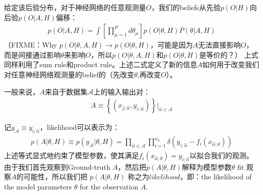 给定该后验分布，对于神经网络的任意观测量$O$，我们的beliefs从先验$p(O|H)$向后验$p(O|A,H)$偏移：
\begin{equation}
    \begin{split}
        p(O|A,H) = \int \left[\prod_{\mu=1}^{P}d\theta_\mu\right]
        p(O|\theta,H)P(\theta|A,H)
    \end{split}
\end{equation}
（FIXME：Why $p(O|\theta,A,H)\rightarrow p(O|\theta,H)$，可能是因为$A$无法直接影响$O$，而是间接通过影响$\theta$来影响$O$，所以$p(O|\theta,A,H)$和$p(O|\theta,H)$是等价的？）
上式同样利用了sum rule和product rule。上述二式定义了新的信息$A$如何用于改变我们对任意神经网络观测量的belief的（先改变$\theta$,再改变$O$）。

一般来说，$A$来自于数据集$\mathcal{A}$上的输入输出对：
\begin{equation}
    \begin{split}
        A \equiv \left\{(x_{j;\hat{\alpha}},y_{i;\hat{\alpha}})\right\}|_{\hat{\alpha}\in \mathcal{A}}
    \end{split}
\end{equation}

记$y_{\mathcal{A}}\equiv{y_{i;\hat{\alpha}}}$，likelihood可以表示为：
\begin{equation}
    \begin{split}
        p(A|\theta,H)\equiv p(y_{\mathcal{A}}|\theta, H) = 
        \prod_{\hat{\alpha}\in\mathcal{A}} \prod_{i=1}^{n_L} \delta\left(y_{i;\hat{\alpha}} - f_i(x_{\hat{\alpha};\theta})\right)
    \end{split}
\end{equation}
上述等式显式地约束了模型参数，使其满足$f_i(x_{\hat{\alpha};\theta})=y_{i;\hat{\alpha}}$以拟合我们的观测。由于我们首先观察到Ground-truth $A$，然后把$p(A|\theta,H)$解释为模型参数$\theta$ fit 观察$A$的可能性，所以我们把 $p(A|\theta,H)$ 称之为$likelihood$，即：the likelihood of the model parameters $\theta$ for the observation $A$.

